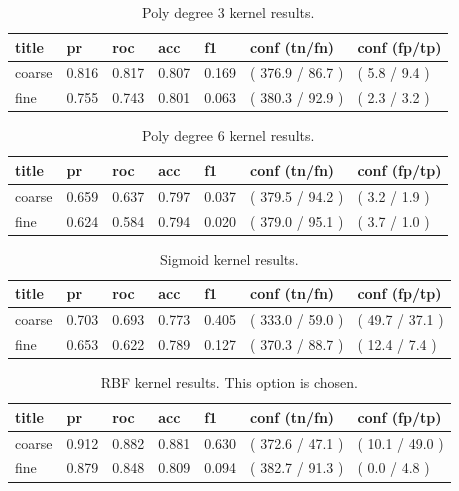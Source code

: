 \documentclass[ms]{nuthesis}
\begin{document}
\FloatBarrier
\begin{table}[H]
\centering
\begin{tabular}{|l||l||l||l||l||l||l|}\toprule
title & pr & roc & acc & f1 & conf (tn/fn) & conf (fp/tp) \\ \midrule
coarse & 0.816 & 0.817 & 0.807 & 0.169 & ( 376.9 / 86.7 ) & ( 5.8 / 9.4 ) \\
fine & 0.755 & 0.743 & 0.801 & 0.063 & ( 380.3 / 92.9 ) & ( 2.3 / 3.2 ) \\ \bottomrule
\end{tabular}
\caption{Poly degree 3 kernel results.}
\label{tab:polyDeg3}
\end{table}
\FloatBarrier

\FloatBarrier
\begin{table}[H]
\centering
\begin{tabular}{|l||l||l||l||l||l||l|}\toprule
title & pr & roc & acc & f1 & conf (tn/fn) & conf (fp/tp) \\ \midrule
coarse & 0.659 & 0.637 & 0.797 & 0.037 & ( 379.5 / 94.2 ) & ( 3.2 / 1.9 ) \\
fine & 0.624 & 0.584 & 0.794 & 0.020 & ( 379.0 / 95.1 ) & ( 3.7 / 1.0 ) \\ \bottomrule
\end{tabular}
\caption{Poly degree 6 kernel results.}
\label{tab:polyDeg6}
\end{table}
\FloatBarrier

\FloatBarrier
\begin{table}[H]
\centering
\begin{tabular}{|l||l||l||l||l||l||l|}\toprule
title & pr & roc & acc & f1 & conf (tn/fn) & conf (fp/tp) \\ \midrule
coarse & 0.703 & 0.693 & 0.773 & 0.405 & ( 333.0 / 59.0 ) & ( 49.7 / 37.1 ) \\
fine & 0.653 & 0.622 & 0.789 & 0.127 & ( 370.3 / 88.7 ) & ( 12.4 / 7.4 ) \\ \bottomrule
\end{tabular}
\caption{Sigmoid kernel results.}
\label{tab:sigmoid}
\end{table}
\FloatBarrier

\FloatBarrier
\begin{table}[H]
\centering
\begin{tabular}{|l||l||l||l||l||l||l|}\toprule
title & pr & roc & acc & f1 & conf (tn/fn) & conf (fp/tp) \\ \midrule
coarse & 0.912 & 0.882 & 0.881 & 0.630 & ( 372.6 / 47.1 ) & ( 10.1 / 49.0 ) \\
fine & 0.879 & 0.848 & 0.809 & 0.094 & ( 382.7 / 91.3 ) & ( 0.0 / 4.8 ) \\ \bottomrule
\end{tabular}
\caption{RBF kernel results. This option is chosen.}
\label{tab:RbfOrig}
\end{table}
\FloatBarrier
\end{document}
